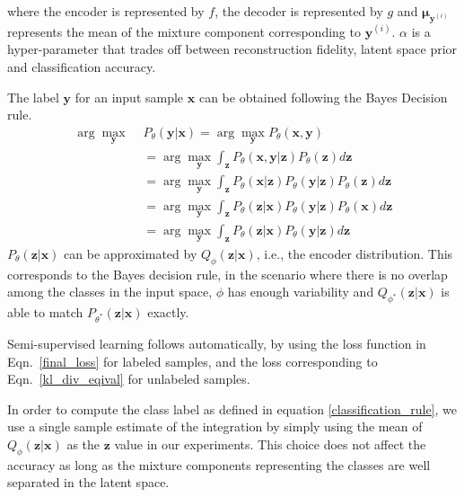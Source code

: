 \documentclass[letterpaper]{article} %
\begin{document}
where the encoder is represented by $f$, the decoder is represented by $g$ and $\boldsymbol{\mu}_{\mathbf{y}^{(i)}}$ represents the mean of the mixture component corresponding to $\mathbf{y}^{(i)}$. $\alpha$ is a hyper-parameter that trades off between reconstruction fidelity, latent space prior and classification accuracy.

The label $\mathbf{y}$ for an input sample $\mathbf{x}$ can be obtained following the Bayes Decision rule.
\begin{equation}
\begin{split}
\arg\max_{\mathbf{y}}\,\, & P_{\theta}(\mathbf{y}|\mathbf{x}) = \arg\max_{\mathbf{y}} P_{\theta}(\mathbf{x,y})\\
&= \arg\max_{\mathbf{y}} \int_{\mathbf{z}} P_{\theta}(\mathbf{x,y}|\mathbf{z})P_{\theta}(\mathbf{z})d\mathbf{z} \\
&= \arg\max_{\mathbf{y}} \int_{\mathbf{z}} P_{\theta}(\mathbf{x}|\mathbf{z})P_{\theta}(\mathbf{y}|\mathbf{z})P_{\theta}(\mathbf{z})d\mathbf{z} \\
&= \arg\max_{\mathbf{y}} \int_{\mathbf{z}} P_{\theta}(\mathbf{z}|\mathbf{x})P_{\theta}(\mathbf{y}|\mathbf{z})P_{\theta}(\mathbf{x})d\mathbf{z} \\
&= \arg\max_{\mathbf{y}} \int_{\mathbf{z}} P_{\theta}(\mathbf{z}|\mathbf{x})P_{\theta}(\mathbf{y}|\mathbf{z})d\mathbf{z}
\end{split}
\label{classification_rule}
\end{equation}
$P_{\theta}(\mathbf{z}|\mathbf{x})$ can be approximated by $Q_{\phi}(\mathbf{z}|\mathbf{x})$, i.e., the encoder distribution. This corresponds to the Bayes decision rule, in the scenario where there is no overlap among the classes in the input space, $\phi$ has enough variability and $Q_{\phi^*}(\mathbf{z}|\mathbf{x})$ is able to match $P_{\theta^*}(\mathbf{z}|\mathbf{x})$ exactly. 

Semi-supervised learning follows automatically, by using the loss function in Eqn.~\ref{final_loss} for labeled samples, and the loss corresponding to Eqn.~\ref{kl_div_eqival} for unlabeled samples.

In order to compute the class label as defined in equation \ref{classification_rule}, we use a single sample estimate of the integration by simply using the mean of $Q_\phi(\mathbf{z}|\mathbf{x})$ as the $\mathbf{z}$ value in our experiments. This choice does not affect the accuracy as long as the mixture components representing the classes are well separated in the latent space.
\end{document}

